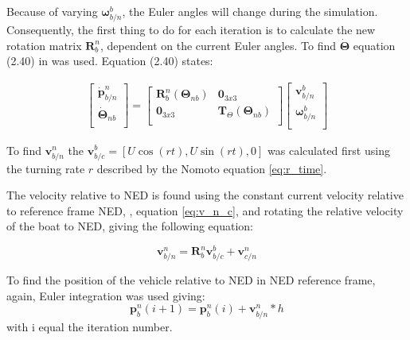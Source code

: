 Because of varying $\boldsymbol{\omega}^b_{b/n}$, the Euler angles will change during the simulation. Consequently, the first thing to do for each iteration is to calculate the new rotation matrix $\mathbf{R}^n_b$, dependent on the current Euler angles. To find $ \dot{\boldsymbol{\Theta}}$ equation (2.40) in \cite{Fossen2011} was used. Equation (2.40) states:

\begin{equation}
    \begin{aligned}
    \begin{bmatrix}
    \dot{\mathbf{p}}^n_{b/n} \\
    \dot{\boldsymbol{\Theta}}_{nb} \\
    \end{bmatrix}
    =
    \begin{bmatrix}
    \mathbf{R}^n_{b}(\boldsymbol{\Theta}_{nb}) & \mathbf{0}_{3x3} \\
    \mathbf{0}_{3x3} & \mathbf{T}_\Theta (\boldsymbol{\Theta}_{nb})  \\
    \end{bmatrix}
    \begin{bmatrix}
    \mathbf{v}^b_{b/n} \\
    \mathbf{\omega}^b_{b/n} \\
    \end{bmatrix}
    \end{aligned}
    \label{eq:eta_dot_J_eta}
\end{equation}

To find $\mathbf{v}^n_{b/n}$ the $\mathbf{v}^b_{b/c} = [U \cos(rt), U \sin(r t),0]$ was calculated first using the turning rate $r$ described by the Nomoto equation \eqref{eq:r_time}. 

The velocity relative to NED is found using the constant current velocity relative to reference frame NED, , equation \eqref{eq:v_n_c}, and rotating the relative velocity of the boat to NED, giving the following equation:

\begin{equation}
    \mathbf{v}^n_{b/n} = \mathbf{R}^n_{b} \mathbf{v}^b_{b/c} + \mathbf{v}^n_{c/n}
\end{equation}

To find the position of the vehicle relative to NED in NED reference frame, again, Euler integration was used giving:
\begin{equation}
    \mathbf{p}^n_b(i+1) = \mathbf{p}^n_b(i) + \mathbf{v}^n_{b/n} * h
\end{equation}
with i equal the iteration number.

